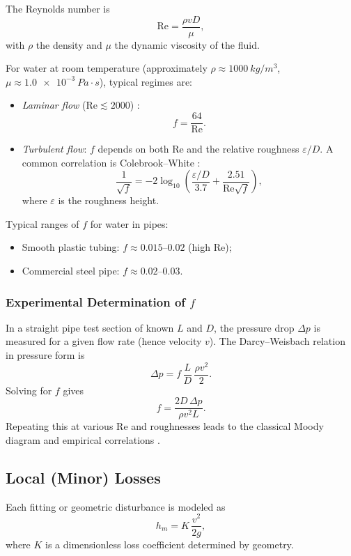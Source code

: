 \documentclass[11pt]{article}
\begin{document}
The Reynolds number is \cite{white_fm}
\[
\mathrm{Re} = \frac{\rho v D}{\mu},
\]
with $\rho$ the density and $\mu$ the dynamic viscosity of the fluid.

For water at room temperature (approximately $\rho \approx
\SI{1000}{kg/m^3}$, $\mu \approx \SI{1.0e-3}{Pa\cdot s}$), typical regimes are:
\begin{itemize}
  \item \emph{Laminar flow} ($\mathrm{Re} \lesssim 2000$) \cite{white_fm}:
        \[
        f = \frac{64}{\mathrm{Re}}.
        \]
  \item \emph{Turbulent flow}: $f$ depends on both $\mathrm{Re}$ and the
        relative roughness $\varepsilon/D$. A common correlation is
        Colebrook--White \cite{colebrook}:
        \[
        \frac{1}{\sqrt{f}}
        = -2\log_{10}\left(
            \frac{\varepsilon/D}{3.7}
            + \frac{2.51}{\mathrm{Re}\sqrt{f}}
          \right),
        \]
        where $\varepsilon$ is the roughness height.
\end{itemize}

Typical ranges of $f$ for water in pipes:
\begin{itemize}
  \item Smooth plastic tubing: $f \approx 0.015$--$0.02$ (high $\mathrm{Re}$);
  \item Commercial steel pipe: $f \approx 0.02$--$0.03$.
\end{itemize}

\subsubsection*{Experimental Determination of $f$}

In a straight pipe test section of known $L$ and $D$, the pressure drop
$\Delta p$ is measured for a given flow rate (hence velocity $v$). The
Darcy--Weisbach relation in pressure form is
\[
\Delta p = f\,\frac{L}{D}\,\frac{\rho v^2}{2}.
\]
Solving for $f$ gives
\[
f = \frac{2D\,\Delta p}{\rho v^2 L}.
\]
Repeating this at various $\mathrm{Re}$ and roughnesses leads to the classical
Moody diagram and empirical correlations \cite{moody}.

\subsection{Local (Minor) Losses}

Each fitting or geometric disturbance is modeled as \cite{white_fm,crane}
\begin{equation}
  h_m = K\,\frac{v^2}{2g},
\end{equation}
where $K$ is a dimensionless loss coefficient determined by geometry.
\end{document}

